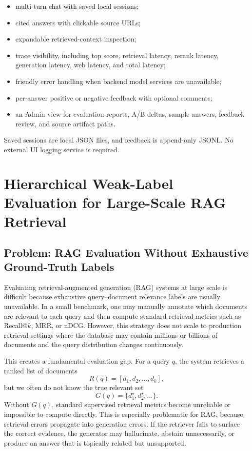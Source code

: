 \documentclass[11pt]{article}
\begin{document}
\begin{itemize}[leftmargin=*]
  \item multi-turn chat with saved local sessions;
  \item cited answers with clickable source URLs;
  \item expandable retrieved-context inspection;
  \item trace visibility, including top score, retrieval latency, rerank latency,
        generation latency, web latency, and total latency;
  \item friendly error handling when backend model services are unavailable;
  \item per-answer positive or negative feedback with optional comments;
  \item an Admin view for evaluation reports, A/B deltas, sample answers, feedback review,
        and source artifact paths.
\end{itemize}

Saved sessions are local JSON files, and feedback is append-only JSONL. No external UI
logging service is required.

\section{Hierarchical Weak-Label Evaluation for Large-Scale RAG Retrieval}
\label{sec:hierarchical-weak-label-eval}

\subsection{Problem: RAG Evaluation Without Exhaustive Ground-Truth Labels}

Evaluating retrieval-augmented generation (RAG) systems at large scale is difficult because exhaustive query--document relevance labels are usually unavailable. In a small benchmark, one may manually annotate which documents are relevant to each query and then compute standard retrieval metrics such as Recall@$k$, MRR, or nDCG. However, this strategy does not scale to production retrieval settings where the database may contain millions or billions of documents and the query distribution changes continuously.

This creates a fundamental evaluation gap. For a query $q$, the system retrieves a ranked list of documents
\[
R(q) = [d_1, d_2, \ldots, d_k],
\]
but we often do not know the true relevant set
\[
G(q) = \{d^\star_1, d^\star_2, \ldots\}.
\]
Without $G(q)$, standard supervised retrieval metrics become unreliable or impossible to compute directly. This is especially problematic for RAG, because retrieval errors propagate into generation errors. If the retriever fails to surface the correct evidence, the generator may hallucinate, abstain unnecessarily, or produce an answer that is topically related but unsupported.
\end{document}
